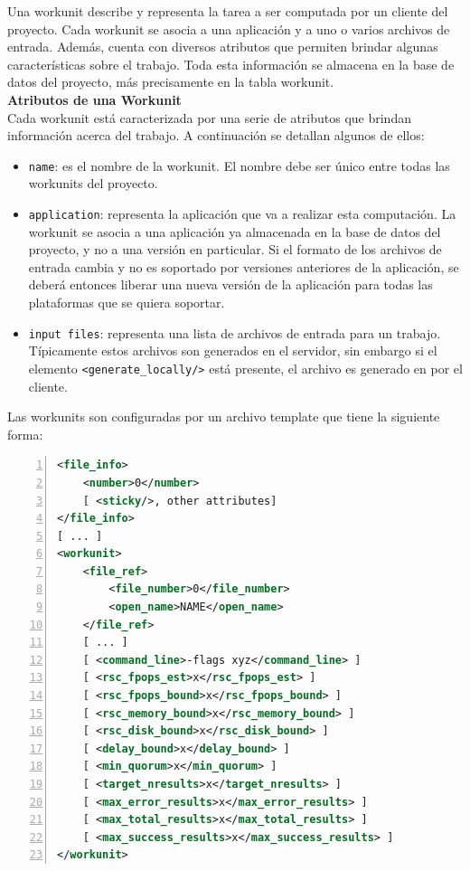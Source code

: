Una workunit describe y representa la tarea a ser computada por un cliente del proyecto. Cada workunit se asocia a una aplicación y a uno o varios archivos de entrada. Además, cuenta con diversos atributos que permiten brindar algunas características sobre el trabajo. Toda esta información se almacena en la base de datos del proyecto, más precisamente en la tabla workunit.
\\

\textbf{Atributos de una Workunit}
\\

Cada workunit está caracterizada por una serie de atributos que brindan información acerca del trabajo. A continuación se detallan algunos de ellos:

\begin{itemize}
\item \texttt{name}: es el nombre de la workunit. El nombre debe ser único entre todas las workunits del proyecto.
\item \texttt{application}: representa la aplicación que va a realizar esta computación. La workunit se asocia a una aplicación ya almacenada en la base de datos del proyecto, y no a una versión en particular. Si el formato de los archivos de entrada cambia y no es soportado por versiones anteriores de la aplicación, se deberá entonces liberar una nueva versión de la aplicación para todas las plataformas que se quiera soportar.
\item \texttt{input files}: representa una lista de archivos de entrada para un trabajo. Típicamente estos archivos son generados en el servidor, sin embargo si el elemento \texttt{<generate\_locally/>} está presente, el archivo es generado en por el cliente. 
\end{itemize}

Las workunits son configuradas por un archivo template que tiene la siguiente forma:
\newpage
\begin{lstlisting}[frame=shadowbox, language=xml, numbers=left, xleftmargin=8mm, framexleftmargin=22pt, basicstyle=\scriptsize, numberstyle=\footnotesize, breaklines=true, breakatwhitespace=false, captionpos=b, caption={Plantilla para la creación de una work unit.}, label=listing:boinc:wu:template, backgroundcolor=\color{gris}, keywordstyle=\color{Blue}]
<file_info>
    <number>0</number>
    [ <sticky/>, other attributes]
</file_info>
[ ... ]
<workunit>
    <file_ref>
        <file_number>0</file_number>
        <open_name>NAME</open_name>
    </file_ref>
    [ ... ]
    [ <command_line>-flags xyz</command_line> ]
    [ <rsc_fpops_est>x</rsc_fpops_est> ]
    [ <rsc_fpops_bound>x</rsc_fpops_bound> ]
    [ <rsc_memory_bound>x</rsc_memory_bound> ]
    [ <rsc_disk_bound>x</rsc_disk_bound> ]
    [ <delay_bound>x</delay_bound> ]
    [ <min_quorum>x</min_quorum> ]
    [ <target_nresults>x</target_nresults> ]
    [ <max_error_results>x</max_error_results> ]
    [ <max_total_results>x</max_total_results> ]
    [ <max_success_results>x</max_success_results> ]
</workunit>
\end{lstlisting}


